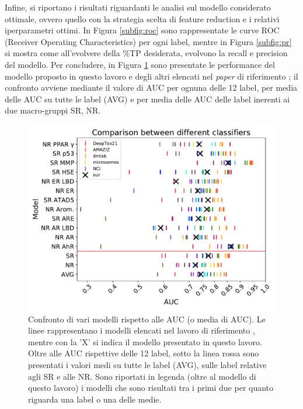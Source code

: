 Infine, si riportano i risultati riguardanti le analisi sul modello considerato ottimale, ovvero quello con la strategia scelta di feature reduction e i relativi iperparametri ottimi.
In Figura \ref{subfig:roc} sono rappresentate le curve ROC (Receiver Operating Characteristics) per ogni label, mentre in Figura \ref{subfig:pr} si mostra come all'evolvere della \%TP desiderata, evolvono la recall e precision del modello.
Per concludere, in Figura \ref{fig:comparison} sono presentate le performance del modello proposto in questo lavoro e degli altri elencati nel \textit{paper} di riferimento \cite{mayr2016deeptox}; il confronto avviene mediante il valore di AUC per ognuna delle 12 label, per media delle AUC su tutte le label (AVG) e per media delle AUC delle label inerenti ai due macro-gruppi SR, NR.
\begin{figure}[!t]
	\centering
	\includegraphics[width=0.9\linewidth]{../images/pdf/comparison}
	\caption{Confronto di vari modelli rispetto alle AUC (o media di AUC). Le linee rappresentano i modelli elencati nel lavoro di riferimento \cite{mayr2016deeptox}, mentre con la 'X' si indica il modello presentato in questo lavoro. Oltre alle AUC rispettive delle 12 label, sotto la linea rossa sono presentati i valori medi su tutte le label (AVG), sulle label relative agli SR e alle NR. Sono riportati in legenda (oltre al modello di questo lavoro) i modelli che sono risultati tra i primi due per quanto riguarda una label o una delle medie.}
	\label{fig:comparison}
\end{figure}